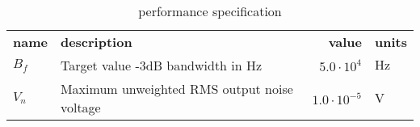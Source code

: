 \begin{table}[H]
\centering
\begin{tabular}[c]{llrl}
\textbf{name} & \textbf{description} & \textbf{value} & \textbf{units} \\ 
\rowcolor{myyellow}
$B_{f}$ &\small{Target value -3dB bandwidth in Hz} &$5.0 \cdot 10^{4}$ &$\mathrm{Hz}$ \\ 
$V_{n}$ &\small{Maximum unweighted RMS output noise voltage} &$1.0 \cdot 10^{-5}$ &$\mathrm{V}$ \\ 
\end{tabular}
\caption{performance specification}
\label{specs-performance}
\end{table}


